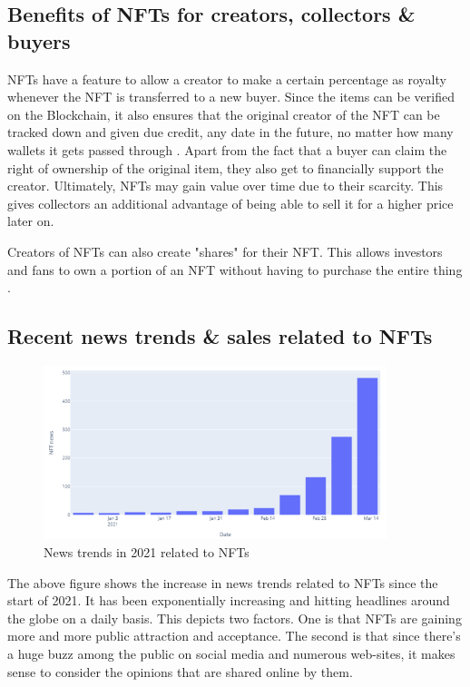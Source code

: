 \subsection{Benefits of NFTs for creators, collectors \& buyers}

NFTs have a feature to allow a creator to make a certain percentage as royalty whenever the NFT is transferred to a new buyer. Since the items can be verified on the Blockchain, it also ensures that the original creator of the NFT can be tracked down and given due credit, any date in the future, no matter how many wallets it gets passed through \autocite{chevet_blockchain_2018}. Apart from the fact that a buyer can claim the right of ownership of the original item, they also get to financially support the creator. Ultimately, NFTs may gain value over time due to their scarcity. This gives collectors an additional advantage of being able to sell it for a higher price later on.

Creators of NFTs can also create "shares" for their NFT. This allows investors and fans to own a portion of an NFT without having to purchase the entire thing \autocite{noauthor_erc-721_nodate}.


\subsection{Recent news trends \& sales related to NFTs}

\begin{figure}[h!]
\centering
\includegraphics[width=10cm]{images/LR/NFT-news-trends.png}
\caption{News trends in 2021 related to NFTs \autocite{dowling_fertile_2021}}
\end{figure}

The above figure shows the increase in news trends related to NFTs since the start of 2021. It has been exponentially increasing and hitting headlines around the globe on a daily basis.
This depicts two factors. One is that NFTs are gaining more and more public attraction and acceptance. The second is that since there's a huge buzz among the public on social media and numerous web-sites, it makes sense to consider the opinions that are shared online by them.


